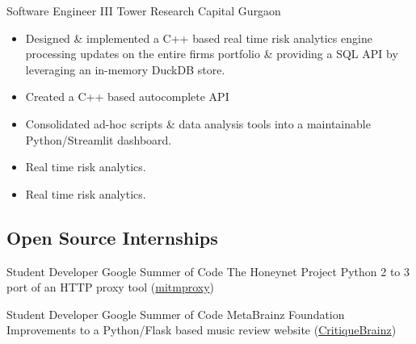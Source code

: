     {Software Engineer III}
    {Tower Research Capital}
    {Gurgaon}
    {}
    {
        \begin{itemize}
            \item Designed \& implemented a C++ based real time risk analytics engine
            processing updates on the entire firms portfolio \&
            providing a SQL API by leveraging an in-memory DuckDB store.
            \item Created a C++ based autocomplete API 
            \item Consolidated ad-hoc scripts 
            \& data analysis tools into a maintainable Python/Streamlit dashboard.
            \item Real time risk analytics.
            \item Real time risk analytics.
        \end{itemize}
    }
    \vspace*{0.2\baselineskip}


\subsection{Open Source Internships}
    \vspace*{0.2\baselineskip}

    {Student Developer}
    {Google Summer of Code}
    {The Honeynet Project}
    {}
    {
        Python 2 to 3 port of an HTTP proxy tool
        (\href{http://github.com/mitmproxy/mitmproxy/}{mitmproxy})
    }
    \vspace*{0.2\baselineskip}

    {Student Developer}
    {Google Summer of Code}
    {MetaBrainz Foundation}
    {}
    {
        Improvements to a Python/Flask based music review website
        (\href{http://critiquebrainz.org/}{CritiqueBrainz})
    }
    \vspace*{0.2\baselineskip}

